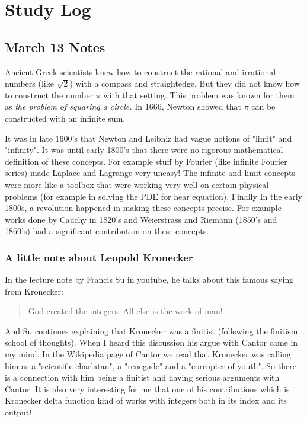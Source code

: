 \section{Study Log}

\subsection{March 13 Notes}

Ancient Greek scientists knew how to construct the rational and irrational numbers (like $ \sqrt{2} $) with a compass and straightedge. But they did not know how to construct the number $\pi $ with that setting. This problem was known for them as \emph{the problem of squaring a circle.} In 1666, Newton showed that $ \pi $ can be constructed with an infinite sum.

It was in late 1600's that Newton and Leibniz had vague notions of "limit" and "infinity". It was until early 1800's that there were no rigorous mathematical definition of these concepts. For example stuff by Fourier (like infinite Fourier series) made Laplace and Lagrange very uneasy! The infinite and limit concepts were more like a toolbox that were working very well on certain physical problems (for example in solving the PDE for hear equation). Finally In the early 1800s, a revolution happened in making these concepts precise. For example works done by Cauchy in 1820's and Weierstrass and Riemann (1850's and 1860's) had a significant contribution on these concepts.  

\subsubsection{A little note about Leopold Kronecker}

In the lecture note by Francis Su in youtube, he talks about this famous saying from Kronecker:
\begin{quote}
	God created the integers. All else is the work of man!
\end{quote}

And Su continues explaining that Kronecker was a finitist (following the finitism school of thoughts). When I heard this discussion his argue with Cantor came in my mind. In the Wikipedia page of Cantor we read that Kronecker was calling him as a "scientific charlatan", a "renegade" and a "corrupter of youth". So there is a connection with him being a finitist and having serious arguments with Cantor. It is also very interesting for me that one of his contributions which is Kronecker delta function kind of works with integers both in its index and its output!

